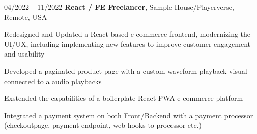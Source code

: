 

\begin{twocolentry}{
    04/2022 – 11/2022
}
\textbf{React / FE Freelancer}, Sample House/Playerverse, Remote, USA\end{twocolentry}

\vspace{0.10 cm}
\begin{onecolentry}
   \begin{highlights}
       \item Redesigned and Updated a React-based e-commerce frontend, modernizing the UI/UX, including implementing new features to improve customer engagement and usability
       \item Developed a paginated product page with a custom waveform playback visual connected to a audio playbacks
       \item Exstended the capabilities of a boilerplate React PWA e-commerce platform
       \item Integrated a payment system on both Front/Backend with a payment processor (checkoutpage, payment endpoint, web hooks to processor etc.)
   \end{highlights}
\end{onecolentry}